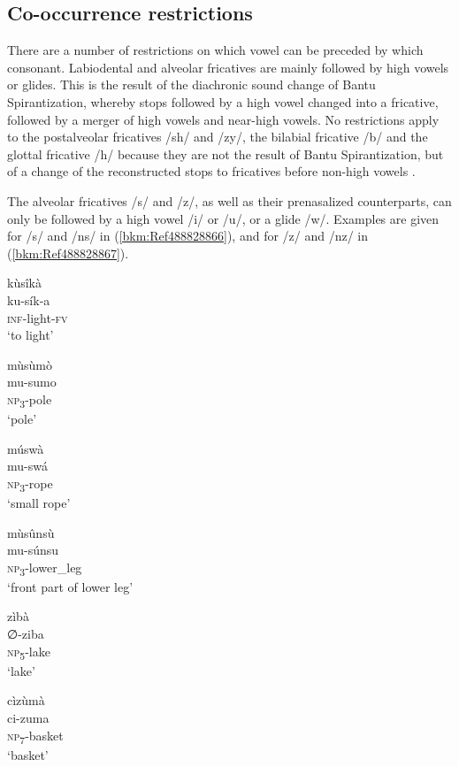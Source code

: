 \subsection{Co-occurrence restrictions}
\hypertarget{Toc75352610}{}\label{bkm:Ref451940391}
There are a number of restrictions on which vowel can be preceded by which conso\-nant. Labiodental and alveolar frica\-tives are mainly followed by high vowels or glides. This is the result of the diachronic sound change of Bantu Spirantization, whereby stops followed by a high vowel changed into a fricative, followed by a merger of high vowels and near-high vowels. No restrictions apply to the postalveolar fricatives /sh/ and /zy/, the bilabial fricative /b/ and the glottal fricative /h/ because they are not the result of Bantu Spirantization, but of a change of the reconstructed stops to fricatives before non-high vowels \citep{Bostoen2009}.

The alveolar fricatives /s/ and /z/, as well as their prenasalized counterparts, can only be followed by a high vowel /i/ or /u/, or a glide /w/. Examples are given for /s/ and /ns/ in (\ref{bkm:Ref488828866}), and for /z/ and /nz/ in (\ref{bkm:Ref488828867}).

\ea
\label{bkm:Ref488828866}
\glll kùsîkà\\
ku-sík-a\\
\textsc{inf}-light-\textsc{fv}\\
\glt ‘to light’
\z

\ea
\glll mùsùmò\\
mu-sumo\\
\textsc{np}\textsubscript{3}-pole\\
\glt ‘pole’
\z

\ea
\glll múswà\\
mu-swá\\
\textsc{np}\textsubscript{3}-rope\\
\glt ‘small rope’
\z

\ea
\glll mùsûnsù\\
mu-súnsu\\
\textsc{np}\textsubscript{3}-lower\_leg\\
\glt ‘front part of lower leg’
\z

\ea
\label{bkm:Ref488828867}
\glll zìbà\\
∅-ziba\\
\textsc{np}\textsubscript{5}-lake\\
\glt ‘lake’
\z

\ea
\glll cìzùmà\\
ci-zuma\\
\textsc{np}\textsubscript{7}-basket\\
\glt ‘basket’
\z

